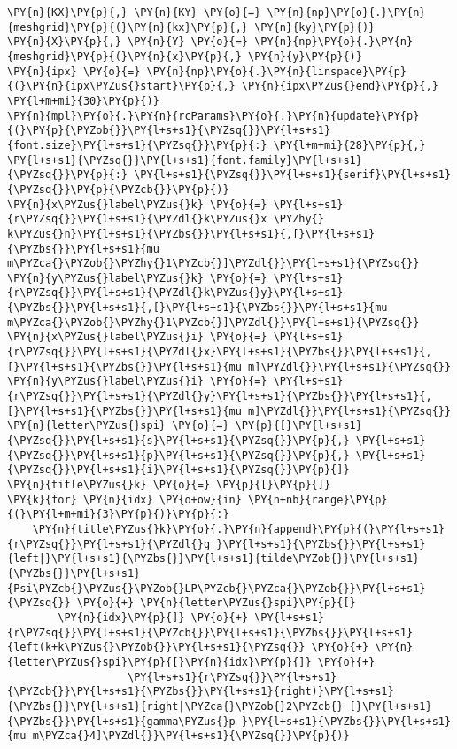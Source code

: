 \begin{Verbatim}[commandchars=\\\{\}]
\PY{n}{KX}\PY{p}{,} \PY{n}{KY} \PY{o}{=} \PY{n}{np}\PY{o}{.}\PY{n}{meshgrid}\PY{p}{(}\PY{n}{kx}\PY{p}{,} \PY{n}{ky}\PY{p}{)}
\PY{n}{X}\PY{p}{,} \PY{n}{Y} \PY{o}{=} \PY{n}{np}\PY{o}{.}\PY{n}{meshgrid}\PY{p}{(}\PY{n}{x}\PY{p}{,} \PY{n}{y}\PY{p}{)}
\PY{n}{ipx} \PY{o}{=} \PY{n}{np}\PY{o}{.}\PY{n}{linspace}\PY{p}{(}\PY{n}{ipx\PYZus{}start}\PY{p}{,} \PY{n}{ipx\PYZus{}end}\PY{p}{,} \PY{l+m+mi}{30}\PY{p}{)}
\PY{n}{mpl}\PY{o}{.}\PY{n}{rcParams}\PY{o}{.}\PY{n}{update}\PY{p}{(}\PY{p}{\PYZob{}}\PY{l+s+s1}{\PYZsq{}}\PY{l+s+s1}{font.size}\PY{l+s+s1}{\PYZsq{}}\PY{p}{:} \PY{l+m+mi}{28}\PY{p}{,} \PY{l+s+s1}{\PYZsq{}}\PY{l+s+s1}{font.family}\PY{l+s+s1}{\PYZsq{}}\PY{p}{:} \PY{l+s+s1}{\PYZsq{}}\PY{l+s+s1}{serif}\PY{l+s+s1}{\PYZsq{}}\PY{p}{\PYZcb{}}\PY{p}{)}
\PY{n}{x\PYZus{}label\PYZus{}k} \PY{o}{=} \PY{l+s+s1}{r\PYZsq{}}\PY{l+s+s1}{\PYZdl{}k\PYZus{}x \PYZhy{} k\PYZus{}n}\PY{l+s+s1}{\PYZbs{}}\PY{l+s+s1}{,[}\PY{l+s+s1}{\PYZbs{}}\PY{l+s+s1}{mu m\PYZca{}\PYZob{}\PYZhy{}1\PYZcb{}]\PYZdl{}}\PY{l+s+s1}{\PYZsq{}}
\PY{n}{y\PYZus{}label\PYZus{}k} \PY{o}{=} \PY{l+s+s1}{r\PYZsq{}}\PY{l+s+s1}{\PYZdl{}k\PYZus{}y}\PY{l+s+s1}{\PYZbs{}}\PY{l+s+s1}{,[}\PY{l+s+s1}{\PYZbs{}}\PY{l+s+s1}{mu m\PYZca{}\PYZob{}\PYZhy{}1\PYZcb{}]\PYZdl{}}\PY{l+s+s1}{\PYZsq{}}
\PY{n}{x\PYZus{}label\PYZus{}i} \PY{o}{=} \PY{l+s+s1}{r\PYZsq{}}\PY{l+s+s1}{\PYZdl{}x}\PY{l+s+s1}{\PYZbs{}}\PY{l+s+s1}{,[}\PY{l+s+s1}{\PYZbs{}}\PY{l+s+s1}{mu m]\PYZdl{}}\PY{l+s+s1}{\PYZsq{}}
\PY{n}{y\PYZus{}label\PYZus{}i} \PY{o}{=} \PY{l+s+s1}{r\PYZsq{}}\PY{l+s+s1}{\PYZdl{}y}\PY{l+s+s1}{\PYZbs{}}\PY{l+s+s1}{,[}\PY{l+s+s1}{\PYZbs{}}\PY{l+s+s1}{mu m]\PYZdl{}}\PY{l+s+s1}{\PYZsq{}}
\PY{n}{letter\PYZus{}spi} \PY{o}{=} \PY{p}{[}\PY{l+s+s1}{\PYZsq{}}\PY{l+s+s1}{s}\PY{l+s+s1}{\PYZsq{}}\PY{p}{,} \PY{l+s+s1}{\PYZsq{}}\PY{l+s+s1}{p}\PY{l+s+s1}{\PYZsq{}}\PY{p}{,} \PY{l+s+s1}{\PYZsq{}}\PY{l+s+s1}{i}\PY{l+s+s1}{\PYZsq{}}\PY{p}{]}
\PY{n}{title\PYZus{}k} \PY{o}{=} \PY{p}{[}\PY{p}{]}
\PY{k}{for} \PY{n}{idx} \PY{o+ow}{in} \PY{n+nb}{range}\PY{p}{(}\PY{l+m+mi}{3}\PY{p}{)}\PY{p}{:}
    \PY{n}{title\PYZus{}k}\PY{o}{.}\PY{n}{append}\PY{p}{(}\PY{l+s+s1}{r\PYZsq{}}\PY{l+s+s1}{\PYZdl{}g }\PY{l+s+s1}{\PYZbs{}}\PY{l+s+s1}{left|}\PY{l+s+s1}{\PYZbs{}}\PY{l+s+s1}{tilde\PYZob{}}\PY{l+s+s1}{\PYZbs{}}\PY{l+s+s1}{Psi\PYZcb{}\PYZus{}\PYZob{}LP\PYZcb{}\PYZca{}\PYZob{}}\PY{l+s+s1}{\PYZsq{}} \PY{o}{+} \PY{n}{letter\PYZus{}spi}\PY{p}{[}
        \PY{n}{idx}\PY{p}{]} \PY{o}{+} \PY{l+s+s1}{r\PYZsq{}}\PY{l+s+s1}{\PYZcb{}}\PY{l+s+s1}{\PYZbs{}}\PY{l+s+s1}{left(k+k\PYZus{}\PYZob{}}\PY{l+s+s1}{\PYZsq{}} \PY{o}{+} \PY{n}{letter\PYZus{}spi}\PY{p}{[}\PY{n}{idx}\PY{p}{]} \PY{o}{+}
                   \PY{l+s+s1}{r\PYZsq{}}\PY{l+s+s1}{\PYZcb{}}\PY{l+s+s1}{\PYZbs{}}\PY{l+s+s1}{right)}\PY{l+s+s1}{\PYZbs{}}\PY{l+s+s1}{right|\PYZca{}\PYZob{}2\PYZcb{} [}\PY{l+s+s1}{\PYZbs{}}\PY{l+s+s1}{gamma\PYZus{}p }\PY{l+s+s1}{\PYZbs{}}\PY{l+s+s1}{mu m\PYZca{}4]\PYZdl{}}\PY{l+s+s1}{\PYZsq{}}\PY{p}{)}

\end{Verbatim}

